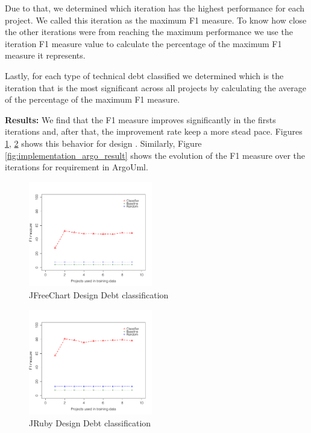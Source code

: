 Due to that, we determined which iteration has the highest performance for each project. We called this iteration as the maximum F1 measure. To know how close the other iterations were from reaching the maximum performance we use the iteration F1 measure value to calculate the percentage of the maximum F1 measure it represents.

Lastly, for each type of technical debt classified we determined which is the iteration that is the most significant across all projects by calculating the average of the percentage of the maximum F1 measure.

\vspace{1mm}
\noindent \textbf{Results:} We find that the F1 measure improves significantly in the firsts iterations and, after that, the improvement rate keep a more stead pace. Figures \ref{fig:design_jfreechart_result}, \ref{fig:design_jruby_result} shows this behavior for design \SATD. Similarly, Figure \ref{fig:implementation_argo_result} shows the evolution of the F1 measure over the iterations for requirement \SATD in ArgoUml. 

\begin{figure}[thb!]
   \centering
  \includegraphics[width=0.48\textwidth]{figures/design_jfreechart.pdf}
  \vspace{-3mm}
  \caption{JFreeChart Design Debt classification}
  \label{fig:design_jfreechart_result}
\end{figure}
 
\begin{figure}[thb!]
  \centering
  \includegraphics[width=0.48\textwidth]{figures/design_jruby.pdf}
  \vspace{-3mm}
  \caption{JRuby Design Debt classification}
  \label{fig:design_jruby_result}
\end{figure}

